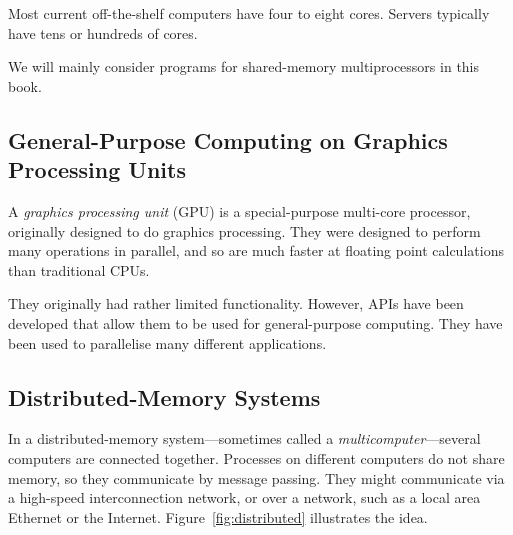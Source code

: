 Most current off-the-shelf computers have four to eight cores.  Servers
typically have tens or hundreds of cores.

We will mainly consider programs for shared-memory multiprocessors in this
book.
 


\subsection{General-Purpose Computing on Graphics Processing Units}


A \emph{graphics processing unit} (GPU) is a special-purpose multi-core
processor, originally designed to do graphics processing.  They were designed
to perform many operations in parallel, and so are much faster at floating
point calculations than traditional
CPUs.

They originally had rather limited functionality.  However, APIs have
been developed that allow them to be used for general-purpose computing.  They
have been used to parallelise many different
applications.


\subsection{Distributed-Memory Systems}

In a distributed-memory system---sometimes called a
\emph{multicomputer}---several computers are connected together.  Processes on
different computers do not share memory, so they communicate by message
passing.  They might communicate via a high-speed interconnection network, or
over a network, such as a local area Ethernet or the Internet.
Figure~\ref{fig:distributed} illustrates the idea.


